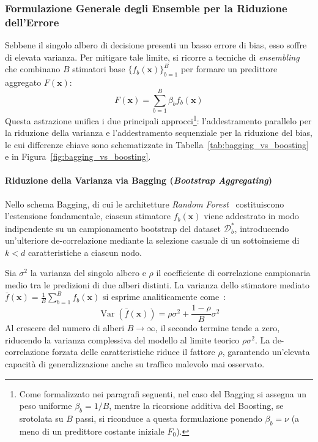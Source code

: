 \subsubsection{Formulazione Generale degli Ensemble per la Riduzione dell'Errore}
Sebbene il singolo albero di decisione presenti un basso errore di bias, esso soffre di elevata varianza. Per mitigare tale limite, si ricorre a tecniche di \textit{ensembling} che combinano $B$ stimatori base $\{f_b(\mathbf{x})\}_{b=1}^B$ per formare un predittore aggregato $F(\mathbf{x})$:
\begin{equation}
    F(\mathbf{x}) = \sum_{b=1}^B \beta_b f_b(\mathbf{x})
\end{equation}
Questa astrazione unifica i due principali approcci\footnote{Come formalizzato nei paragrafi seguenti, nel caso del Bagging si assegna un peso uniforme $\beta_b = 1/B$, mentre la ricorsione additiva del Boosting, se srotolata su $B$ passi, si riconduce a questa formulazione ponendo $\beta_b = \nu$ (a meno di un predittore costante iniziale $F_0$).}: l'addestramento parallelo per la riduzione della varianza e l'addestramento sequenziale per la riduzione del bias, le cui differenze chiave sono schematizzate in Tabella~\ref{tab:bagging_vs_boosting} e in Figura~\ref{fig:bagging_vs_boosting}.

\paragraph{Riduzione della Varianza via Bagging (\textit{Bootstrap Aggregating})}
Nello schema Bagging, di cui le architetture \textit{Random Forest}~\cite{breiman2001} costituiscono l'estensione fondamentale, ciascun stimatore $f_b(\mathbf{x})$ viene addestrato in modo indipendente su un campionamento bootstrap del dataset $\mathcal{D}_b^*$, introducendo un'ulteriore de-correlazione mediante la selezione casuale di un sottoinsieme di $k < d$ caratteristiche a ciascun nodo.

Sia $\sigma^2$ la varianza del singolo albero e $\rho$ il coefficiente di correlazione campionaria medio tra le predizioni di due alberi distinti. La varianza dello stimatore mediato $\bar{f}(\mathbf{x}) = \frac{1}{B} \sum_{b=1}^B f_b(\mathbf{x})$ si esprime analiticamente come~\cite{hastie2009}:
\begin{equation}
    \operatorname{Var}(\bar{f}(\mathbf{x})) = \rho \sigma^2 + \frac{1 - \rho}{B} \sigma^2
\end{equation}
Al crescere del numero di alberi $B \to \infty$, il secondo termine tende a zero, riducendo la varianza complessiva del modello al limite teorico $\rho \sigma^2$. La de-correlazione forzata delle caratteristiche riduce il fattore $\rho$, garantendo un'elevata capacità di generalizzazione anche su traffico malevolo mai osservato.

